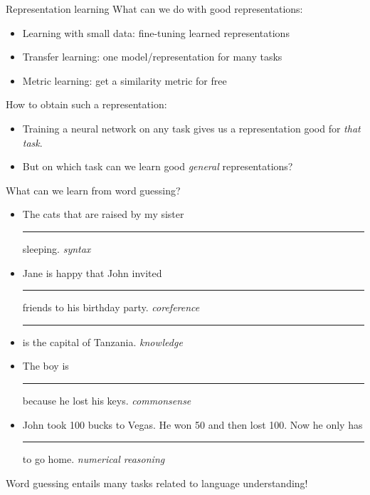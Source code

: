 \documentclass[usenames,dvipsnames,notes,11pt,aspectratio=169,hyperref={colorlinks=true, linkcolor=blue}]{beamer}
\begin{document}
\begin{frame}
    {Representation learning}
    What can we do with good representations:\\
    \begin{itemize}
        \item Learning with small data: fine-tuning learned representations
        \item Transfer learning: one model/representation for many tasks 
        \item Metric learning: get a similarity metric for free 
    \end{itemize}

    \pause\bigskip
    How to obtain such a representation:
    \begin{itemize}
        \item Training a neural network on any task gives us a representation good for \textit{that task}.
        \item But on which task can we learn good \textit{general} representations?
    \end{itemize}
\end{frame}

\begin{frame}
    {What can we learn from word guessing?}
    \begin{itemize}
        \itemsep1em
        \item The cats that are raised by my sister \rule{1.5cm}{0.5mm} sleeping. \pause\hfill \textit{syntax}
        \item Jane is happy that John invited \rule{1.5cm}{0.5mm} friends to his birthday party. \pause\hfill \textit{coreference}
        \item \rule{1.5cm}{0.5mm} is the capital of Tanzania. \pause\hfill \textit{knowledge}
        \item The boy is \rule{1.5cm}{0.5mm} because he lost his keys.  \pause\hfill \textit{commonsense}
        \item John took 100 bucks to Vegas. He won 50 and then lost 100. Now he only has \rule{1.5cm}{0.5mm} to go home. \pause\hfill \textit{numerical reasoning}
    \end{itemize}

    \pause\medskip
    Word guessing entails many tasks related to language understanding!

\end{frame}
\end{document}
